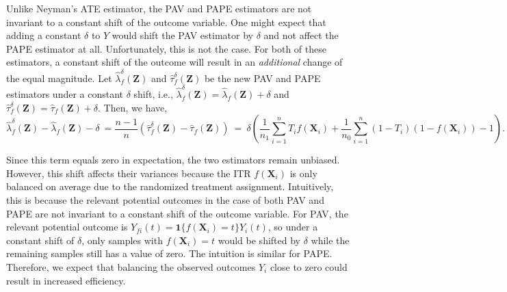 \documentclass[USenglish,onecolumn]{article}
\newcommand\bX{\bm{X}}
\newcommand\bZ{\bm{Z}}
\begin{document}
Unlike Neyman's ATE estimator, the PAV and PAPE estimators are not
invariant to a constant shift of the outcome variable.  One might
expect that adding a constant $\delta$ to $Y$ would shift the PAV
estimator by $\delta$ and not affect the PAPE estimator at all.
Unfortunately, this is not the case.  For both of these estimators, a
constant shift of the outcome will result in an \emph{additional}
change of the equal magnitude.  Let $\hat\lambda^\delta_f(\bZ)$ and
$\hat\tau^\delta_f(\bZ)$ be the new PAV and PAPE estimators under a
constant $\delta$ shift, i.e.,
$\hat\lambda^\delta_f(\bZ) = \hat\lambda_f(\bZ)+\delta$ and
$\hat\tau^\delta_f(\bZ)= \hat\tau_f(\bZ)+\delta$. Then, we have,
\begin{equation*}
  \hat\lambda^\delta_f(\bZ) -\hat\lambda_f(\bZ)  - \delta \ = 	\frac{n-1}{n}\left(\hat\tau^\delta_f(\bZ) -\hat\tau_f(\bZ)\right)
  \ = \ \delta\left(\frac{1}{n_1}\sum_{i=1}^n T_if(\bX_i) + \frac{1}{n_0}\sum_{i=1}^n (1-T_i)(1-f(\bX_i)) -1\right).
\end{equation*}

Since this term equals zero in expectation, the two estimators remain
unbiased.  However, this shift affects their variances because the ITR
$f(\bX_i)$ is only balanced on average due to the randomized treatment
assignment. Intuitively, this is because the relevant potential
outcomes in the case of both PAV and PAPE are not invariant to a
constant shift of the outcome variable. For PAV, the relevant
potential outcome is $Y_{fi}(t)=\mathbf{1}\{f(\bX_i)=t\}Y_i(t)$, so
under a constant shift of $\delta$, only samples with $f(\bX_i)=t$
would be shifted by $\delta$ while the remaining samples still has a
value of zero. The intuition is similar for PAPE. Therefore, we expect
that balancing the observed outcomes $Y_i$ close to zero could result
in increased efficiency.
\end{document}
